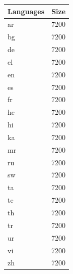 \begin{figure}[h]
    \centering
    
    \begin{subtable}{0.32\textwidth}
        \centering
        \begin{tabular}{lr}
            \toprule
            Languages & Size \\
            \midrule
            ar & 7200 \\
            bg & 7200 \\
            de & 7200 \\
            el & 7200 \\
            en & 7200 \\
            es & 7200 \\
            fr & 7200 \\
            he & 7200 \\
            hi & 7200 \\
            ka & 7200 \\
            mr & 7200 \\
            ru & 7200 \\
            sw & 7200 \\
            ta & 7200 \\
            te & 7200 \\
            th & 7200 \\
            tr & 7200 \\
            ur & 7200 \\
            vi & 7200 \\
            zh & 7200 \\
            \bottomrule
        \end{tabular}
        \caption{\citet{chung_improving_2020}}
        \label{tab:chung_clusters_k20}
        


\end{subtable}
\end{figure}
